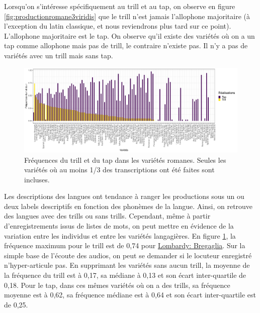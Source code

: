 Lorsqu'on s'intéresse spécifiquement au trill et au tap, on observe en figure \ref{fig:productionromane3viridis} que le trill n'est jamais l'allophone majoritaire (à l'exception du latin classique, et nous reviendrons plus tard sur ce point). L'allophone majoritaire est le tap. On observe qu'il existe des variétés où on a un tap comme allophone mais pas de trill, le contraire n'existe pas. Il n'y a pas de variétés avec un trill mais sans tap.\\

\begin{figure}
	\centering
	\includegraphics[width=1\linewidth]{substance/images/freq_trill_romance2}
	\caption[Fréquences du trill et du tap dans les variétés romanes]{Fréquences du trill et du tap dans les variétés romanes. Seules les variétés où au moins 1/3 des transcriptions ont été faites sont incluses.}
	\label{fig:freqtrillromance}
\end{figure}

Les descriptions des langues ont tendance à ranger les productions sous un ou deux labels descriptifs en fonction des phonèmes de la langue. Ainsi, on retrouve des langues avec des trills ou sans trills. Cependant, même à partir d'enregistrements issus de listes de mots, on peut mettre en évidence de la variation entre les individus et entre les variétés langagières. En figure \ref{fig:freqtrillromance}, la fréquence maximum pour le trill est de 0,74 pour \href{https://soundcomparisons.com/#/en/Romance/language/Rce_It_Nth_LomW_VCh_Bivio_Dl}{Lombardy: Bregaglia}. Sur la simple base de l'écoute des audios, on peut se demander si le locuteur enregistré n'hyper-articule pas.
En supprimant les variétés sans aucun trill, la moyenne de la fréquence du trill est à 0,17, sa médiane à 0,13 et son écart inter-quartile de 0,18.
Pour le tap, dans ces mêmes variétés où on a des trills, sa fréquence moyenne est à 0,62, sa fréquence médiane est à 0,64 et son écart inter-quartile est de 0,25.\\

